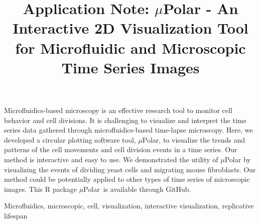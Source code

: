 \documentclass[conference]{IEEEtran}
\begin{document}
\title{ Application Note: $\mu$Polar \-- An Interactive 2D Visualization Tool for  Microfluidic and  Microscopic Time Series Images }

 \author{
 \and
{}
 }

\maketitle
\begin{Summary}
Microfluidics-based microscopy is an effective research tool to monitor cell behavior and cell divisions. It is challenging to visualize and interpret the time series data gathered through microfluidics-based time-lapse  microscopy. Here, we developed a circular plotting software tool, $\mu$Polar, to visualize the trends and patterns of the cell movements and cell division events in a time series. Our method is interactive and easy to use. We demonstrated the utility of $\mu$Polar by visualizing the events of dividing yeast cells and migrating mouse fibroblasts. Our method could be potentially applied to other types of time series of microscopic images. This R package $\mu$Polar\ is available through GitHub.
\end{Summary}


\begin{IEEEkeywords}
Microfluidics, microscopic, cell, visualization, interactive visualization, replicative lifespan 
\end{IEEEkeywords}
\end{document}
